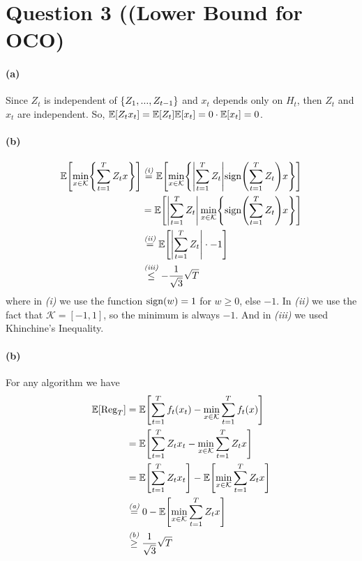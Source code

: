 \documentclass{article}
\DeclarePairedDelimiter\br{(}{)}%
\DeclarePairedDelimiter\brs{[}{]}%
\DeclarePairedDelimiter\brc{\{}{\}}%
\DeclarePairedDelimiter\abs{\lvert}{\rvert}%
\newcommand{\textrel}[2]{\stackrel{\textit{\text{#1}}}{#2} }
\newcommand{\ntext}[1]{{\text{\normalfont#1}}}
\newcommand{\sign}{\ntext{sign}}
\newcommand{\E}{\mathbb{E}}
\newcommand{\Kcal}{\mathcal{K}}
\newcommand{\Reg}{\text{Reg}}
\begin{document}
\section{Question 3 ((Lower Bound for OCO)}
\paragraph{(a)}
Since $Z_t$ is independent of $\brc*{Z_1,...,Z_{t-1}}$ and $x_t$ depends only on $H_t$, then $Z_t$ and $x_t$ are independent.
So, $\E \brs*{Z_t x_t} = \E \brs*{Z_t} \E  \brs*{x_t} =  0 \cdot \E  \brs*{x_t} = 0$.
\paragraph{(b)}
\begin{align*}
    \E \brs*{\min_{x \in \Kcal} \brc*{\sum_{t=1}^{T} Z_t x}} 
    &\textrel{(i)}{=}  \E \brs*{\min_{x \in \Kcal} \brc*{ \abs*{\sum_{t=1}^{T} Z_t} \sign \br*{\sum_{t=1}^{T} Z_t} x}} \\
    &=  \E \brs*{ \abs*{\sum_{t=1}^{T} Z_t} \min_{x \in \Kcal} \brc*{ \sign \br*{\sum_{t=1}^{T} Z_t} x}} \\
    &\textrel{(ii)}{=} \E \brs*{ \abs*{\sum_{t=1}^{T} Z_t} \cdot -1} \\
      &\textrel{(iii)}{\leq} - \frac{1}{\sqrt{3}} \sqrt{T}
\end{align*}
where in \textit{(i)} we use the function $\sign(w)=1$ for $w \geq 0$, else $-1$.
In  \textit{(ii)} we use the fact that $\Kcal=[-1,1]$, so the minimum is always $-1$.
And in \textit{(iii)} we used Khinchine's Inequality.
\paragraph{(b)}
For any algorithm we have
\begin{align*}
    \E \brs*{\Reg_T} &=    \E \brs*{ \sum_{t=1}^{T} f_t(x_t) - \min_{x \in \Kcal} \sum_{t=1}^{T} f_t(x)} \\
    &=  \E \brs*{ \sum_{t=1}^{T} Z_t x_t - \min_{x \in \Kcal} \sum_{t=1}^{T} Z_t x} \\
    &=  \E \brs*{ \sum_{t=1}^{T} Z_t x_t}  -  \E \brs*{\min_{x \in \Kcal} \sum_{t=1}^{T} Z_t x} \\
    &\textrel{(a)}{=}   0  -  \E \brs*{\min_{x \in \Kcal} \sum_{t=1}^{T} Z_t x} \\
      &\textrel{(b)}{\geq}   \frac{1}{\sqrt{3}} \sqrt{T}
\end{align*}
\end{document}
